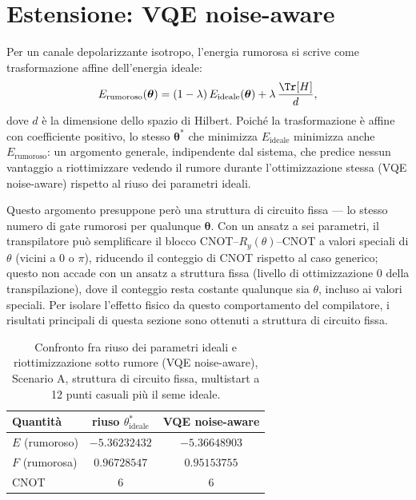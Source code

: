 \documentclass[11pt,a4paper]{article}
\begin{document}
\section{Estensione: VQE noise-aware}
\label{sec:noise-aware}

Per un canale depolarizzante isotropo, l'energia rumorosa si scrive come
trasformazione affine dell'energia ideale:
\begin{equation}
E_\text{rumoroso}(\boldsymbol\theta) = (1-\lambda)\,E_\text{ideale}(\boldsymbol\theta)
+ \lambda\,\frac{\Tr[H]}{d},
\end{equation}
dove $d$ è la dimensione dello spazio di Hilbert. Poiché la
trasformazione è affine con coefficiente positivo, lo stesso
$\boldsymbol\theta^*$ che minimizza $E_\text{ideale}$ minimizza anche
$E_\text{rumoroso}$: un argomento generale, indipendente dal sistema, che
predice nessun vantaggio a riottimizzare vedendo il rumore durante
l'ottimizzazione stessa (VQE noise-aware) rispetto al riuso dei parametri
ideali.

Questo argomento presuppone però una struttura di circuito fissa --- lo
stesso numero di gate rumorosi per qualunque $\boldsymbol\theta$. Con un
ansatz a sei parametri, il transpilatore può semplificare il blocco
CNOT--$R_y(\theta)$--CNOT a valori speciali di $\theta$ (vicini a $0$ o
$\pi$), riducendo il conteggio di CNOT rispetto al caso generico; questo
non accade con un ansatz a struttura fissa (livello di ottimizzazione 0
della transpilazione), dove il conteggio resta costante qualunque sia
$\theta$, incluso ai valori speciali. Per isolare l'effetto fisico da
questo comportamento del compilatore, i risultati principali di questa
sezione sono ottenuti a struttura di circuito fissa.

\begin{table}[htbp]
\centering
\small
\renewcommand{\arraystretch}{1.3}
\begin{tabular}{@{}lcc@{}}
\toprule
\rowcolor{grigetto}
\textbf{Quantità} & \textbf{riuso $\theta^*_\text{ideale}$} & \textbf{VQE noise-aware} \\
\midrule
$E$ (rumoroso) & $-5.36232432$ & $-5.36648903$ \\
$F$ (rumorosa) & $0.96728547$ & $0.95153755$ \\
CNOT & 6 & 6 \\
\bottomrule
\end{tabular}
\caption{Confronto fra riuso dei parametri ideali e riottimizzazione
sotto rumore (VQE noise-aware), Scenario A, struttura di circuito
fissa, multistart a 12 punti casuali più il seme ideale.}
\end{table}
\FloatBarrier
\end{document}
